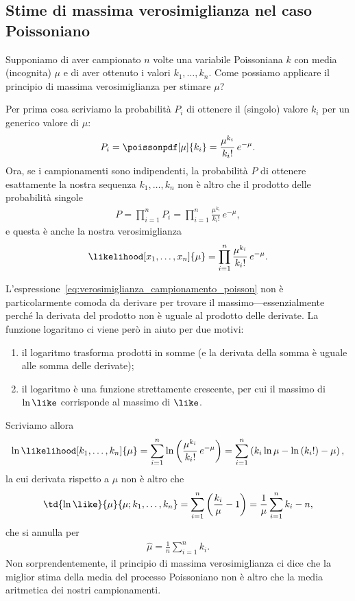 \subsection{Stime di massima verosimiglianza nel caso Poissoniano}
\label{sec:stima_max_ver_poisson}

Supponiamo di aver campionato $n$ volte una variabile Poissoniana $k$ con
media (incognita) $\mu$ e di aver ottenuto i valori $k_1,\ldots,k_n$. Come
possiamo applicare il principio di massima verosimiglianza per stimare $\mu$?

Per prima cosa scriviamo la probabilità $P_i$ di ottenere il (singolo) valore
$k_i$ per un generico valore di $\mu$:
\begin{align*}
  P_i = \poissonpdf[\mu]{k_i} = \frac{\mu^{k_i}}{k_i!}\,e^{-\mu}.
\end{align*}
Ora, se i campionamenti sono indipendenti, la probabilità $P$ di ottenere
esattamente la nostra sequenza $k_1,\ldots,k_n$ non è altro che il prodotto
delle probabilità singole
\begin{align*}
  P = \prod_{i = 1}^n P_i = \prod_{i = 1}^n \frac{\mu^{k_i}}{k_i!}\,e^{-\mu},
\end{align*}
e questa è anche la nostra verosimiglianza
\begin{align}\label{eq:verosimiglianza_campionamento_poisson}
  \likelihood[x_1,\ldots,x_n]{\mu} =
  \prod_{i = 1}^n \frac{\mu^{k_i}}{k_i!}\,e^{-\mu}.
\end{align}

L'espressione~\ref{eq:verosimiglianza_campionamento_poisson} non è
particolarmente comoda da derivare per trovare il massimo---essenzialmente
perché la derivata del prodotto non è uguale al prodotto delle derivate.
La funzione logaritmo ci viene però in aiuto per due motivi:
\begin{enumerate}
\item il logaritmo trasforma prodotti in somme (e la derivata della somma è
  uguale alle somma delle derivate);
\item il logaritmo è una funzione strettamente crescente, per cui il massimo
  di $\ln \like$ corrisponde al massimo di $\like$.
\end{enumerate}
Scriviamo allora
\begin{align}
  \ln\likelihood[k_1,\ldots,k_n]{\mu} =
  \sum_{i = 1}^n \ln \left( \frac{\mu^{k_i}}{k_i!}\,e^{-\mu} \right) =
  \sum_{i = 1}^n \left( k_i \ln \mu - \ln\left( k_i! \right) - \mu \right),
\end{align}
la cui derivata rispetto a $\mu$ non è altro che
\begin{align*}
  \td{\ln\like}{\mu}{\mu;k_1,\ldots,k_n} =
  \sum_{i = 1}^n \left(\frac{k_i}{\mu} - 1 \right) =
  \frac{1}{\mu} \sum_{i = 1}^n k_i - n,
\end{align*}
che si annulla per
\begin{align}
  \hat{\mu} = \frac{1}{n} \sum_{i = 1}^n k_i.
\end{align}
Non sorprendentemente, il principio di massima verosimiglianza ci dice che
la miglior stima della media del processo Poissoniano non è altro che la
media aritmetica dei nostri campionamenti.


